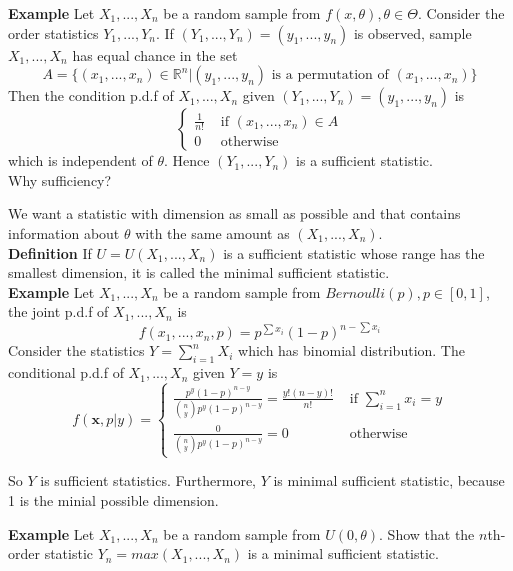 \documentclass[a4paper,12pt]{article}
\begin{document}
\textbf{Example} Let $X_1, ..., X_n$ be a random sample from $f(x, \theta), \theta\in\Theta$. Consider the order statistics $Y_1, ..., Y_n$. If $(Y_1, ..., Y_n) = (y_1, ..., y_n)$ is observed, sample $X_1, ..., X_n$ has equal chance in the set 
$$A = \{ (x_1, ..., x_n)\in\mathbb{R}^n | (y_1, ..., y_n) \text{ is a permutation of } (x_1, ..., x_n) \}$$
Then the condition p.d.f of $X_1, ..., X_n$ given $(Y_1, ..., Y_n) = (y_1, ..., y_n)$ is
$$\begin{cases}
\frac{1}{n!} & \text{ if } (x_1, ..., x_n) \in A \\
0 & \text{ otherwise}
\end{cases}$$
which is independent of $\theta$. Hence $(Y_1, ..., Y_n)$ is a sufficient statistic.\\

Why sufficiency?

We want a statistic with dimension as small as possible and that contains information about $\theta$ with the same amount as $(X_1, ..., X_n)$.\\

\textbf{Definition} If $U = U(X_1, ..., X_n)$ is a sufficient statistic whose range has the smallest dimension, it is called the minimal sufficient statistic.\\

\textbf{Example} Let $X_1, ..., X_n$ be a random sample from $Bernoulli(p), {p\in[0,1]}$, the joint p.d.f of $X_1, ..., X_n$ is
$$f(x_1, ..., x_n, p) = p^{\sum x_i}(1-p)^{n-\sum x_i}$$
Consider the statistics $Y = \sum_{i=1}^n X_i$ which has binomial distribution. The conditional p.d.f of $X_1, ..., X_n$ given $Y=y$ is $$f(\textbf{x}, p | y) = 
\begin{cases}
\frac{p^y(1-p)^{n-y}}{{n \choose y}p^y(1-p)^{n-y}} = \frac{y!(n-y)!}{n!} & \text{ if } \sum_{i=1}^n x_i = y \\
\frac{0}{{n \choose y}p^y(1-p)^{n-y}} = 0 & \text{ otherwise}
\end{cases}$$  

So $Y$ is sufficient statistics. Furthermore, $Y$ is minimal sufficient statistic, because 1 is the minial possible dimension.

\textbf{Example} Let $X_1, ..., X_n$ be a random sample from $U(0, \theta)$. Show that the $n$th-order statistic $Y_n = max(X_1, ..., X_n)$ is a minimal sufficient statistic.\\
\end{document}
